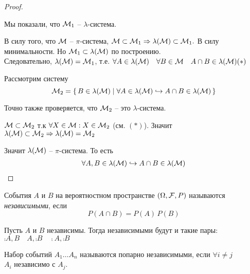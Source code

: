 \begin{proof}
\begin{enumerate}
	\end{enumerate}
			Мы показали, что $\mathcal{M}_1$ -- $\lambda$-система.

			В силу того, что $\mathcal{M}$ -- $\pi$-система, $\mathcal{M} \subset \mathcal{M}_1 
			\Rightarrow \lambda(\mathcal{M}) \subset \mathcal{M}_1.$ 
			В силу минимальности. Но $\mathcal{M}_1 \subset \lambda(\mathcal{M})$ по построению. \\
			Следовательно, $\lambda(\mathcal{M}) = \mathcal{M}_1$, т.е. 
			$\forall A \in \lambda(\mathcal{M}) \quad \forall B \in \mathcal{M} \quad A \cap B \in \lambda(\mathcal{M}) (*)$
			
			Рассмотрим систему
			\begin{equation*}
				\mathcal{M}_2 = \left\{ \, B \in \lambda(\mathcal{M}) \mid \forall A \in \lambda(\mathcal{M}) \hookrightarrow A \cap B \in \lambda(\mathcal{M}) \, \right\}
			\end{equation*}

			Точно также проверяется, что $\mathcal{M}_2$ -- это $\lambda$-система.

			$\mathcal{M} \subset \mathcal{M}_2$ т.к $\forall X \in \mathcal{M}: X \in \mathcal{M}_2$  (см. $(*)$).
			Значит $\lambda(\mathcal{M}) \subset \mathcal{M}_2 \Rightarrow \lambda(\mathcal{M}) = \mathcal{M}_2$
			
			Значит $\lambda(\mathcal{M})$ -- $\pi$-система. То есть 
			\begin{align*}
				\forall A, B \in \lambda(\mathcal{M}) \hookrightarrow A \cap B \in \lambda(\mathcal{M})
			\end{align*}
\end{proof}


\begin{definition}
	События $A$ и $B$ на вероятностном пространстве $(\Omega, \mathcal{F}, P)$ 
	называются \emph{независимыми}, если
	\begin{equation*}
		P(A \cap B) = P(A) \, P(B)
	\end{equation*}
\end{definition}

\begin{exercise}
	Пусть $A$ и $B$ независимы. Тогда независимыми будут и такие пары:\\
	$\comp{A}, B \quad A, \comp{B} \quad \comp{A}, \comp{B}$
\end{exercise}
 
\begin{definition}
	Набор событий $A_1 \ldots A_n$ называются попарно независимыми, если $\forall i \neq j$ \\
	$A_i$ независимо с $A_j$.
\end{definition}

